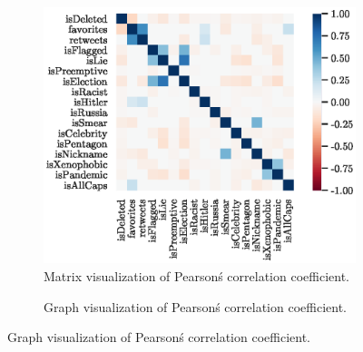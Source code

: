 \documentclass{article}
\begin{document}
    \begin{figure}
         \vspace{-2cm}
         \begin{subfigure}{\textwidth}
             \hspace{-3.05cm}
             \includegraphics{corr_heatmap.eps}
             \caption{Matrix visualization of Pearson\'s correlation coefficient.}
         \end{subfigure}
         \hspace{.8cm}
         \vspace{2cm}
         \begin{subfigure}{\textwidth}
             
             \caption{Graph visualization of Pearson\'s correlation coefficient.}
         \end{subfigure}
    \end{figure}
\end{document}
